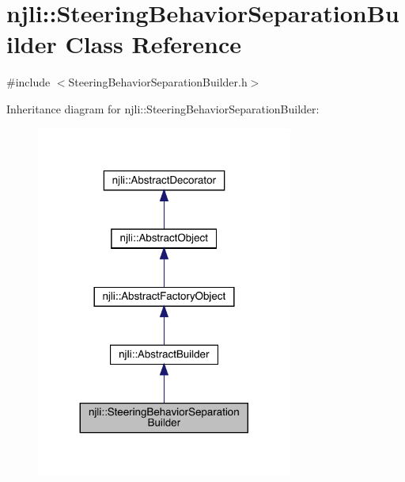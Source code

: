\hypertarget{classnjli_1_1_steering_behavior_separation_builder}{}\section{njli\+:\+:Steering\+Behavior\+Separation\+Builder Class Reference}
\label{classnjli_1_1_steering_behavior_separation_builder}


{\ttfamily \#include $<$Steering\+Behavior\+Separation\+Builder.\+h$>$}



Inheritance diagram for njli\+:\+:Steering\+Behavior\+Separation\+Builder\+:\nopagebreak
\begin{figure}[H]
\begin{center}
\leavevmode
\includegraphics[width=239pt]{classnjli_1_1_steering_behavior_separation_builder__inherit__graph}
\end{center}
\end{figure}


